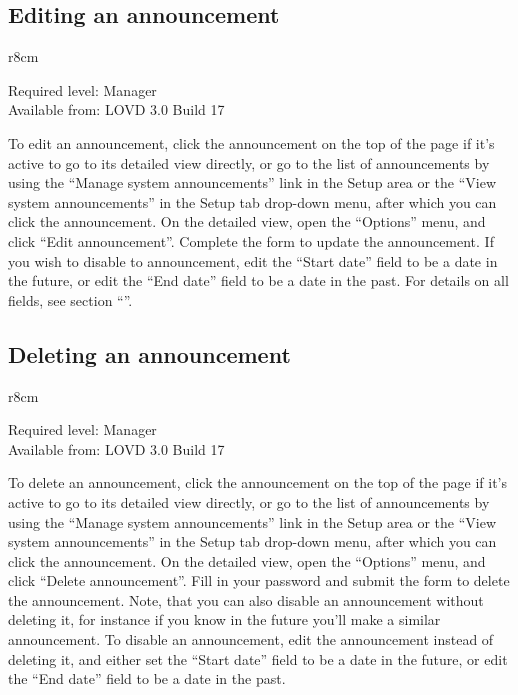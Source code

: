 \subsection{Editing an announcement}
\begin{wrapfigure}[3]{r}{8cm} %
  \vspace{-25pt}
  \begin{leftbar}
    Required level: Manager\\
    Available from: LOVD 3.0 Build 17
  \end{leftbar}
\end{wrapfigure}
To edit an announcement, click the announcement on the top of the page if it's active to go to its detailed view
 directly, or go to the list of announcements by using the ``Manage system announcements'' link in the Setup area
 or the ``View system announcements'' in the Setup tab drop-down menu, after which you can click the announcement.
On the detailed view, open the ``Options'' menu, and click ``Edit announcement''.
Complete the form to update the announcement.
If you wish to disable to announcement, edit the ``Start date'' field to be a date in the future,
 or edit the ``End date'' field to be a date in the past.
For details on all fields, see section ``''.



\subsection{Deleting an announcement}
\begin{wrapfigure}[3]{r}{8cm} %
  \vspace{-25pt}
  \begin{leftbar}
    Required level: Manager\\
    Available from: LOVD 3.0 Build 17
  \end{leftbar}
\end{wrapfigure}
To delete an announcement, click the announcement on the top of the page if it's active to go to its detailed view
 directly, or go to the list of announcements by using the ``Manage system announcements'' link in the Setup area
 or the ``View system announcements'' in the Setup tab drop-down menu, after which you can click the announcement.
On the detailed view, open the ``Options'' menu, and click ``Delete announcement''.
Fill in your password and submit the form to delete the announcement.
Note, that you can also disable an announcement without deleting it,
 for instance if you know in the future you'll make a similar announcement.
To disable an announcement, edit the announcement instead of deleting it, and either set
 the ``Start date'' field to be a date in the future, or edit the ``End date'' field to be a date in the past.






